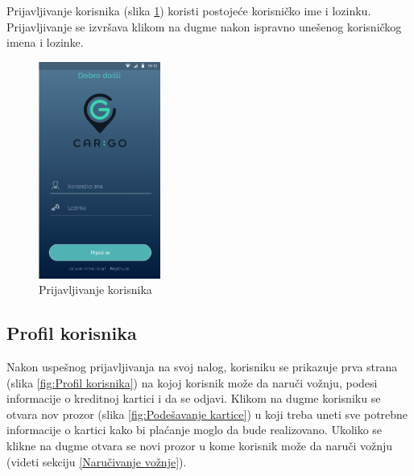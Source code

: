 Prijavljivanje korisnika (slika \ref{fig:Prijavljivanje korisnika}) koristi postojeće korisničko ime i lozinku. Prijavljivanje se izvršava klikom na dugme  nakon ispravno unešenog korisničkog imena i lozinke.
\begin{figure}[H]
\begin{center}
\includegraphics[width=4cm]{Slike/Prijavljivanje.png}
\end{center}
    \caption{Prijavljivanje korisnika}
\label{fig:Prijavljivanje korisnika}
\end{figure}


\subsection{\bfseries Profil korisnika}

Nakon uspešnog prijavljivanja na svoj nalog, korisniku se prikazuje prva strana (slika \ref{fig:Profil korisnika}) na kojoj korisnik može da naruči vožnju, podesi informacije o kreditnoj kartici i da se odjavi. Klikom na dugme  korisniku se otvara nov prozor (slika \ref{fig:Podešavanje kartice}) u koji treba uneti sve potrebne informacije o kartici kako bi plaćanje moglo da bude realizovano. Ukoliko se klikne na dugme  otvara se novi prozor u kome korisnik može da naruči vožnju (videti sekciju \ref{Naručivanje vožnje}).


